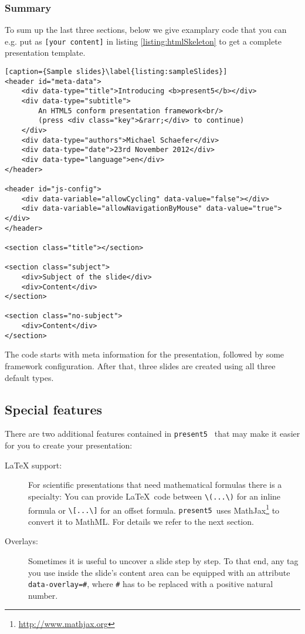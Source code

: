 \documentclass{scrartcl}
\newcommand{\present}{\code{present5}}
\newcommand{\code}[1]{{\tt #1}}
\begin{document}
\subsubsection{Summary}

To sum up the last three sections, below we give examplary code that you can e.g. put as \code{[your content]} in listing \ref{listing:htmlSkeleton} to get a complete presentation template.

\begin{lstlisting}[caption={Sample slides}\label{listing:sampleSlides}]
<header id="meta-data">
	<div data-type="title">Introducing <b>present5</b></div>
	<div data-type="subtitle">
		An HTML5 conform presentation framework<br/>
		(press <div class="key">&rarr;</div> to continue)
	</div>
	<div data-type="authors">Michael Schaefer</div>
	<div data-type="date">23rd November 2012</div>
	<div data-type="language">en</div>
</header>

<header id="js-config">
	<div data-variable="allowCycling" data-value="false"></div>
	<div data-variable="allowNavigationByMouse" data-value="true"></div>
</header>

<section class="title"></section>

<section class="subject">
	<div>Subject of the slide</div>
	<div>Content</div>
</section>

<section class="no-subject">
	<div>Content</div>
</section>
\end{lstlisting}

The code starts with meta information for the presentation, followed by some framework configuration. After that, three slides are created using all three default types.


\subsection{Special features}
\label{section:special-features}

There are two additional features contained in \present~ that may make it easier for you to create your presentation:

\begin{description}  
\item[LaTeX support:]
  For scientific presentations that need mathematical formulas there is a specialty: You can provide \LaTeX~code between \code{\textbackslash(...\textbackslash)} for an inline formula or \code{\textbackslash[...\textbackslash]}  for an offset formula. \present~uses MathJax\footnote{\href{http://www.mathjax.org}{http://www.mathjax.org}} to convert it to MathML. For details we refer to the next section.

\item[Overlays:]
  Sometimes it is useful to uncover a slide step by step. To that end, any tag you use inside the slide's content area can be equipped with an attribute \code{data-overlay=\#}, where \code{\#} has to be replaced with a positive natural number.
\end{description}
\end{document}
